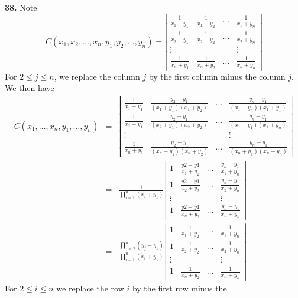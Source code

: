 \documentclass[a4paper,12pt]{article}
\newcommand{\newpar}[1]{\bigskip \noindent \textbf{#1.}}
\begin{document}
\newpar{38}  Note
\[ C(x_1, x_2, \ldots, x_n, y_1, y_2, \ldots, y_n) = \left|
\begin{array}{cccc}
  \frac{1}{x_1+y_1} & \frac{1}{x_1+y_2} & \ldots & \frac{1}{x_1+y_n}\\
  \frac{1}{x_2+y_1} & \frac{1}{x_2+y_2} & \ldots & \frac{1}{x_2+y_n}\\
  \vdots & & & \vdots \\
  \frac{1}{x_n+y_1} & \frac{1}{x_n + y_2} & \ldots & \frac{1}{x_n+y_n}
\end{array} \right| \]
For $2\le j\le n$, we replace the column $j$ by the first column minus
the column $j$.  We then have
\begin{eqnarray*}
  C(x_1, \ldots, x_n, y_1,\ldots,y_n) &=& \left|
  \begin{array}{cccc}
    \frac{1}{x_1+y_1} & \frac{y_2-y_1}{(x_1+y_1)(x_1+y_2)} &
    \ldots & \frac{y_n - y_1}{(x_1+y_n)(x_1+y_1)} \\
    \frac{1}{x_2+y_1} & \frac{y_2-y_1}{(x_2+y_1)(x_2+y_2)} &
    \ldots & \frac{y_n - y_1}{(x_1+y_1)(x_1+y_n)} \\
    \vdots & & & \vdots \\
    \frac{1}{x_n+y_1} & \frac{y_2-y_1}{(x_n+y_1)(x_n+y_2)} & \ldots &
    \frac{y_n-y_1}{(x_n+y_1)(x_n+y_n)}
  \end{array} \right| \\
  &=& \frac{1}{\prod_{i=1}^n(x_i+y_1)} \left|
  \begin{array}{cccc}
    1 & \frac{y2-y1}{x_1+y_2} & \ldots & \frac{y_n-y_1}{x_1+y_n} \\
    1 & \frac{y2-y1}{x_2+y_2} & \ldots & \frac{y_n-y_1}{x_2+y_n} \\
    \vdots & & & \vdots \\
    1 & \frac{y2-y1}{x_n+y_2} & \ldots & \frac{y_n-y_1}{x_n+y_n}
  \end{array} \right| \\
  &=& \frac{\prod_{j=2}^n(y_j-y_1)}{\prod_{i=1}^n(x_i+y_1)} \left|
  \begin{array}{cccc}
  1 & \frac{1}{x_1+y_2} & \ldots & \frac{1}{x_1+y_n} \\
  1 & \frac{1}{x_2+y_2} & \ldots & \frac{1}{x_2+y_n} \\
  \vdots & & & \vdots \\
  1 & \frac{1}{x_n+y_2} & \ldots & \frac{1}{x_n+y_n}
  \end{array} \right|
\end{eqnarray*}
For $2\le i\le n$ we replace the row $i$ by the first row minus the
\end{document}
